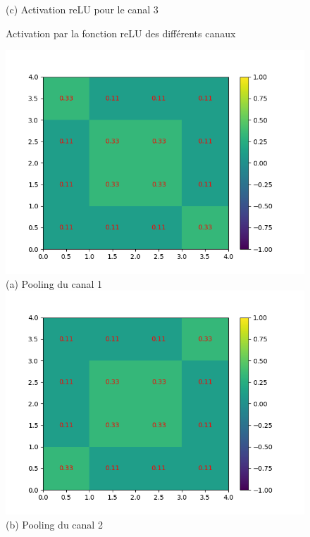 \begin{figure}[h]
        \center 
        (c) Activation reLU pour le canal 3
    \endminipage
    \caption{Activation par la fonction reLU des différents canaux}
\end{figure}

\begin{figure}[h]
        \includegraphics[width=\textwidth]{img/cnn_exemple/square/stride_1_max.png}
        \center 
        (a) Pooling du canal 1
    \endminipage\hfill
        \includegraphics[width=\textwidth]{img/cnn_exemple/square/stride_2_max.png}
        \center 
        (b) Pooling du canal 2
    \endminipage\hfill

\end{figure}
